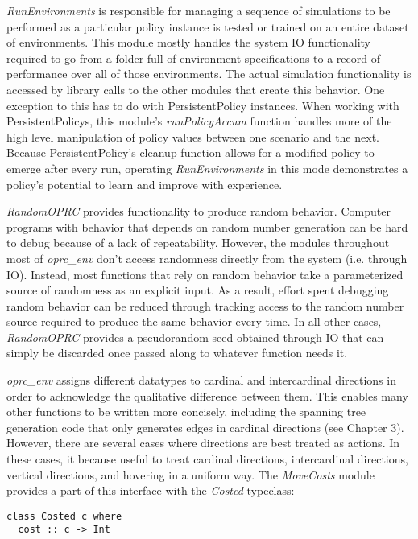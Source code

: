 \textit{RunEnvironments} is responsible for managing a sequence of simulations to be performed as a particular policy instance is tested or trained on an entire dataset of environments. This module mostly handles the system IO functionality required to go from a folder full of environment specifications to a record of performance over all of those environments. The actual simulation functionality is accessed by library calls to the other modules that create this behavior. One exception to this has to do with PersistentPolicy instances. When working with PersistentPolicys, this module's \textit{runPolicyAccum} function handles more of the high level manipulation of policy values between one scenario and the next. Because PersistentPolicy's cleanup function allows for a modified policy to emerge after every run, operating \textit{RunEnvironments} in this mode demonstrates a policy's potential to learn and improve with experience.

\textit{RandomOPRC} provides functionality to produce random behavior. Computer programs with behavior that depends on random number generation can be hard to debug because of a lack of repeatability. However, the modules throughout most of \textit{oprc\_env} don't access randomness directly from the system (i.e. through IO). Instead, most functions that rely on random behavior take a parameterized source of randomness as an explicit input. As a result, effort spent debugging random behavior can be reduced through tracking access to the random number source required to produce the same behavior every time. In all other cases, \textit{RandomOPRC} provides a pseudorandom seed obtained through IO that can simply be discarded once passed along to whatever function needs it.

\textit{oprc\_env} assigns different datatypes to cardinal and intercardinal directions in order to acknowledge the qualitative difference between them. This enables many other functions to be written more concisely, including the spanning tree generation code that only generates edges in cardinal directions (see Chapter 3). However, there are several cases where directions are best treated as actions. In these cases, it because useful to treat cardinal directions, intercardinal directions, vertical directions, and hovering in a uniform way. The \textit{MoveCosts} module provides a part of this interface with the \textit{Costed} typeclass:

\begin{verbatim}
class Costed c where
  cost :: c -> Int
\end{verbatim}

